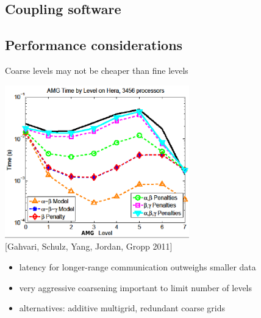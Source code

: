 \documentclass{beamer}
\begin{document}
\subsection{Coupling software}




% 
% 

% 
% 


% 
% 

% 
% 
\subsection{Performance considerations}

\begin{frame}{Coarse levels may not be cheaper than fine levels}
  \begin{center}
    \includegraphics[width=0.6\textwidth]{figures/YangAMGLevelCost} \\
    {\scriptsize [Gahvari, Schulz, Yang, Jordan, Gropp 2011]}
  \end{center}
  \begin{itemize}
  \item latency for longer-range communication outweighs smaller data
  \item very aggressive coarsening important to limit number of levels
  \item alternatives: additive multigrid, redundant coarse grids
  \end{itemize}
\end{frame}
\end{document}
